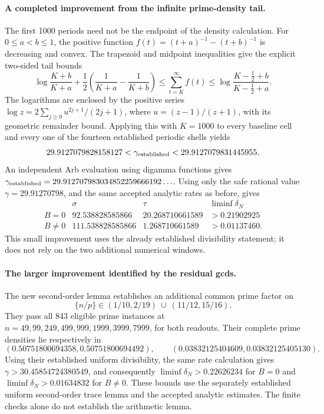 \paragraph{A completed improvement from the infinite prime-density tail.}
The first 1000 periods need not be the endpoint of the density calculation.
For $0\le a<b\le1$, the positive function
$f(t)=(t+a)^{-1}-(t+b)^{-1}$ is decreasing and convex. The trapezoid and
midpoint inequalities give the explicit two-sided tail bounds
\[
 \log\frac{K+b}{K+a}+\frac12\left(\frac1{K+a}-\frac1{K+b}\right)
 \le \sum_{t=K}^{\infty}f(t)
 \le \log\frac{K-\frac12+b}{K-\frac12+a}.
\]
The logarithms are enclosed by the positive series
$\log z=2\sum_{j\ge0}u^{2j+1}/(2j+1)$, where $u=(z-1)/(z+1)$,
with its geometric remainder bound. Applying this with $K=1000$ to
every baseline cell and every one of the fourteen established periodic
shells yields
\[
 29.9127079828158127 <\gamma_{\rm established}
 <29.9127079831445955.
\]
An independent Arb evaluation using digamma functions gives
$\gamma_{\rm established}=29.912707983034852259666192\ldots$.
Using only the safe rational value $\gamma=29.91270798$, and the same
accepted analytic rates as before, gives
\[
\begin{array}{c|cc|c}
 &\sigma&\tau&\liminf\delta_N\\\hline
 B=0&92.538828585866&20.268710661589&>0.21902925\\
 B\ne0&111.538828585866&1.268710661589&>0.01137460.
\end{array}
\]
This small improvement uses the already established divisibility statement;
it does not rely on the two additional numerical windows.

\paragraph{The larger improvement identified by the residual gcds.}
The new second-order lemma establishes an additional common prime factor on
\[
 \{n/p\}\in(1/10,2/19)\ \cup\ (11/12,15/16).
\]
They pass all 843 eligible prime instances at
$n=49,99,249,499,999,1999,3999,7999$, for both readouts.
Their complete prime densities lie respectively in
\[
 (0.50751800694358,0.50751800694492),\qquad
 (0.03832125404609,0.03832125405130).
\]
Using their established uniform divisibility, the same rate
calculation gives $\gamma>30.45854724380549$, and consequently
$\liminf\delta_N>0.22626234$ for $B=0$ and
$\liminf\delta_N>0.01634832$ for $B\ne0$.
These bounds use the separately established uniform second-order trace
lemma and the accepted analytic estimates. The finite checks alone do not
establish the arithmetic lemma.
